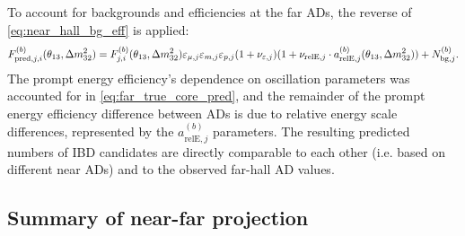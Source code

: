 To account for backgrounds and efficiencies at the far ADs,
the reverse of \cref{eq:near_hall_bg_eff} is applied:
\begin{equation}\label{eq:far_hall_bg_eff}
    F_{\text{pred},j,i}^{(b)}(\theta_{13},\Delta m^2_{32}) = F_{j,i}^{(b)}(\theta_{13},\Delta m^2_{32})
        \varepsilon_{\mu,j}\varepsilon_{m,j}\varepsilon_{p,j}
        (1 + \nu_{\varepsilon,j})
        (1 + \nu_{\text{relE},j}\cdot a_{\text{relE},j}^{(b)}(\theta_{13},\Delta m^2_{32}))
    + N_{\text{bg},j}^{(b)}.
\end{equation}
The prompt energy efficiency's dependence on oscillation parameters
was accounted for in \cref{eq:far_true_core_pred},
and the remainder of the prompt energy efficiency difference between ADs
is due to relative energy scale differences,
represented by the $a_{\text{relE},j}^{(b)}$ parameters.
The resulting predicted numbers of IBD candidates
are directly comparable to each other (i.e. based on different near ADs)
and to the observed far-hall AD values.

\subsection{Summary of near-far projection}
\label{subsec:model_summary}

